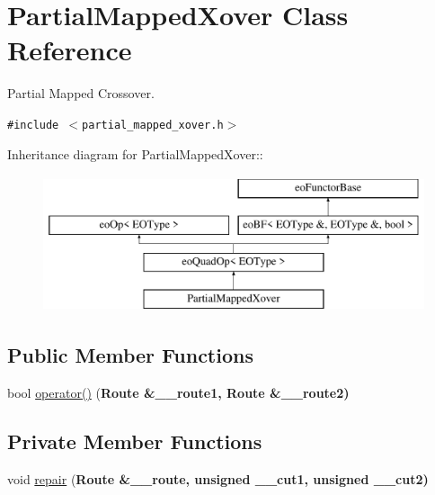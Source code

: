 \hypertarget{classPartialMappedXover}{
\section{Partial\-Mapped\-Xover Class Reference}
\label{classPartialMappedXover}
}
Partial Mapped Crossover.  


{\tt \#include $<$partial\_\-mapped\_\-xover.h$>$}

Inheritance diagram for Partial\-Mapped\-Xover::\begin{figure}[H]
\begin{center}
\leavevmode
\includegraphics[height=4cm]{classPartialMappedXover}
\end{center}
\end{figure}
\subsection*{Public Member Functions}
\begin{CompactItemize}
\item 
\hypertarget{classPartialMappedXover_1cda6ea86ca36e5de0125f4ba5cfc695}{
bool \hyperlink{classPartialMappedXover_1cda6ea86ca36e5de0125f4ba5cfc695}{operator()} (\bf{Route} \&\_\-\_\-route1, \bf{Route} \&\_\-\_\-route2)}
\label{classPartialMappedXover_1cda6ea86ca36e5de0125f4ba5cfc695}

\end{CompactItemize}
\subsection*{Private Member Functions}
\begin{CompactItemize}
\item 
\hypertarget{classPartialMappedXover_b6d4035544aff3b2b3fe4b0eeea185a2}{
void \hyperlink{classPartialMappedXover_b6d4035544aff3b2b3fe4b0eeea185a2}{repair} (\bf{Route} \&\_\-\_\-route, unsigned \_\-\_\-cut1, unsigned \_\-\_\-cut2)}
\label{classPartialMappedXover_b6d4035544aff3b2b3fe4b0eeea185a2}

\end{CompactItemize}


